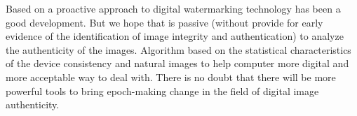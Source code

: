 \documentclass[a4paper, 10pt, notitlepage]{report}
\begin{document}
	Based on a proactive approach to digital watermarking technology has been a good development. But we hope that is passive (without provide for early evidence of the identification of image integrity and authentication) to analyze the authenticity of the images. Algorithm based on the statistical characteristics of the device consistency and natural images to help computer more digital and more acceptable way to deal with. There is no doubt that there will be more powerful tools to bring epoch-making change in the field of digital image authenticity.

\label{lstpage2}
\end{document}
